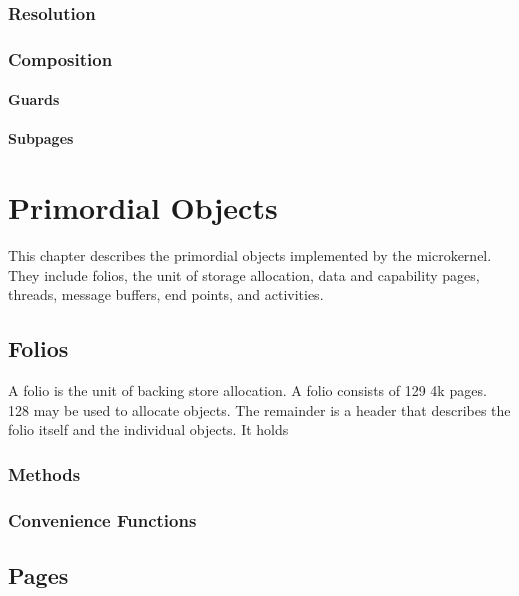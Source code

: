\subsection{Resolution}

\subsection{Composition}

\subsubsection{Guards}

\subsubsection{Subpages}




\chapter{Primordial Objects}

This chapter describes the primordial objects implemented by the
microkernel.  They include folios, the unit of storage allocation,
data and capability pages, threads, message buffers, end points, and
activities.

\cleardoublepage
\section{Folios}

A folio is the unit of backing store allocation.  A folio consists of
129 4k pages.  128 may be used to allocate objects.  The remainder is
a header that describes the folio itself and the individual objects.
It holds

\subsection{Methods}

\subsection{Convenience Functions}

\cleardoublepage
\section{Pages}

